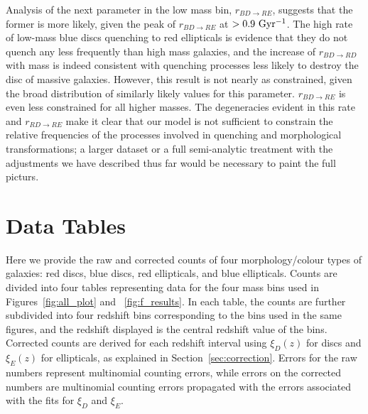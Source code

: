 \documentclass[useAMS,usenatbib]{mn2e}
\begin{document}
 Analysis of the next parameter in the low mass bin, $r_{BD\rightarrow RE}$, suggests that the former is more likely, given the peak of $r_{BD \rightarrow RE}$ at $>0.9 ~\rm Gyr^{-1}$. The high rate of low-mass blue discs quenching to red ellipticals is evidence that they do not quench any less frequently than high mass galaxies, and the increase of $r_{BD \rightarrow RD}$ with mass is indeed consistent with quenching processes less likely to destroy the disc of massive galaxies. However, this result is not nearly as constrained, given the broad distribution of similarly likely values for this parameter. $r_{BD \rightarrow RE}$ is even less constrained for all higher masses. The degeneracies evident in this rate and $r_{RD \rightarrow RE}$ make it clear that our model is not sufficient to constrain the relative frequencies of the processes involved in quenching and morphological transformations; a larger dataset or a full semi-analytic treatment with the adjustments we have described thus far would be necessary to paint the full picturs. 




\section{Data Tables}
\label{appx:datatables}
Here we provide the raw and corrected counts of four morphology/colour types of galaxies: red discs, blue discs, red ellipticals, and blue ellipticals. Counts are divided into four tables representing data for the four mass bins used in Figures~\ref{fig:all_plot} and ~\ref{fig:f_results}. In each table, the counts are further subdivided into four redshift bins corresponding to the bins used in the same figures, and the redshift displayed is the central redshift value of the bins. Corrected counts are derived for each redshift interval using $\xi_D(z)$ for discs and $\xi_E(z)$ for ellipticals, as explained in Section~\ref{sec:correction}. Errors for the raw numbers represent multinomial counting errors, while errors on the corrected numbers are multinomial counting errors propagated with the errors associated with the fits for $\xi_D$ and $\xi_E$.  
\end{document}

